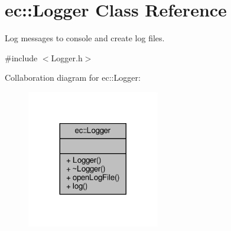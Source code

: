 \hypertarget{classec_1_1_logger}{}\section{ec\+:\+:Logger Class Reference}
\label{classec_1_1_logger}


Log messages to console and create log files.  




{\ttfamily \#include $<$Logger.\+h$>$}



Collaboration diagram for ec\+:\+:Logger\+:\nopagebreak
\begin{figure}[H]
\begin{center}
\leavevmode
\includegraphics[width=164pt]{classec_1_1_logger__coll__graph}
\end{center}
\end{figure}
